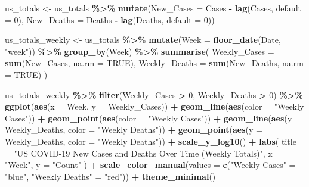 \documentclass[
]{article}
\newenvironment{Shaded}{\begin{snugshade}}{\end{snugshade}}
\newcommand{\AttributeTok}[1]{\textcolor[rgb]{0.13,0.29,0.53}{#1}}
\newcommand{\ConstantTok}[1]{\textcolor[rgb]{0.56,0.35,0.01}{#1}}
\newcommand{\DecValTok}[1]{\textcolor[rgb]{0.00,0.00,0.81}{#1}}
\newcommand{\FunctionTok}[1]{\textcolor[rgb]{0.13,0.29,0.53}{\textbf{#1}}}
\newcommand{\NormalTok}[1]{#1}
\newcommand{\OtherTok}[1]{\textcolor[rgb]{0.56,0.35,0.01}{#1}}
\newcommand{\SpecialCharTok}[1]{\textcolor[rgb]{0.81,0.36,0.00}{\textbf{#1}}}
\newcommand{\StringTok}[1]{\textcolor[rgb]{0.31,0.60,0.02}{#1}}
\begin{document}
\begin{Shaded}
\begin{Highlighting}[]
\NormalTok{us\_totals }\OtherTok{\textless{}{-}}\NormalTok{ us\_totals }\SpecialCharTok{\%\textgreater{}\%}
  \FunctionTok{mutate}\NormalTok{(}\AttributeTok{New\_Cases =}\NormalTok{ Cases }\SpecialCharTok{{-}} \FunctionTok{lag}\NormalTok{(Cases, }\AttributeTok{default =} \DecValTok{0}\NormalTok{),}
         \AttributeTok{New\_Deaths =}\NormalTok{ Deaths }\SpecialCharTok{{-}} \FunctionTok{lag}\NormalTok{(Deaths, }\AttributeTok{default =} \DecValTok{0}\NormalTok{))}

\NormalTok{us\_totals\_weekly }\OtherTok{\textless{}{-}}\NormalTok{ us\_totals }\SpecialCharTok{\%\textgreater{}\%}
  \FunctionTok{mutate}\NormalTok{(}\AttributeTok{Week =} \FunctionTok{floor\_date}\NormalTok{(Date, }\StringTok{"week"}\NormalTok{)) }\SpecialCharTok{\%\textgreater{}\%}
  \FunctionTok{group\_by}\NormalTok{(Week) }\SpecialCharTok{\%\textgreater{}\%}
  \FunctionTok{summarise}\NormalTok{(}
    \AttributeTok{Weekly\_Cases =} \FunctionTok{sum}\NormalTok{(New\_Cases, }\AttributeTok{na.rm =} \ConstantTok{TRUE}\NormalTok{),}
    \AttributeTok{Weekly\_Deaths =} \FunctionTok{sum}\NormalTok{(New\_Deaths, }\AttributeTok{na.rm =} \ConstantTok{TRUE}\NormalTok{)}
\NormalTok{  )}

\NormalTok{us\_totals\_weekly }\SpecialCharTok{\%\textgreater{}\%}
  \FunctionTok{filter}\NormalTok{(Weekly\_Cases }\SpecialCharTok{\textgreater{}} \DecValTok{0}\NormalTok{, Weekly\_Deaths }\SpecialCharTok{\textgreater{}} \DecValTok{0}\NormalTok{) }\SpecialCharTok{\%\textgreater{}\%}
  \FunctionTok{ggplot}\NormalTok{(}\FunctionTok{aes}\NormalTok{(}\AttributeTok{x =}\NormalTok{ Week, }\AttributeTok{y =}\NormalTok{ Weekly\_Cases)) }\SpecialCharTok{+}
  \FunctionTok{geom\_line}\NormalTok{(}\FunctionTok{aes}\NormalTok{(}\AttributeTok{color =} \StringTok{"Weekly Cases"}\NormalTok{)) }\SpecialCharTok{+}
  \FunctionTok{geom\_point}\NormalTok{(}\FunctionTok{aes}\NormalTok{(}\AttributeTok{color =} \StringTok{"Weekly Cases"}\NormalTok{)) }\SpecialCharTok{+}
  \FunctionTok{geom\_line}\NormalTok{(}\FunctionTok{aes}\NormalTok{(}\AttributeTok{y =}\NormalTok{ Weekly\_Deaths, }\AttributeTok{color =} \StringTok{"Weekly Deaths"}\NormalTok{)) }\SpecialCharTok{+}
  \FunctionTok{geom\_point}\NormalTok{(}\FunctionTok{aes}\NormalTok{(}\AttributeTok{y =}\NormalTok{ Weekly\_Deaths, }\AttributeTok{color =} \StringTok{"Weekly Deaths"}\NormalTok{)) }\SpecialCharTok{+}
  \FunctionTok{scale\_y\_log10}\NormalTok{() }\SpecialCharTok{+}
  \FunctionTok{labs}\NormalTok{(}
    \AttributeTok{title =} \StringTok{"US COVID{-}19 New Cases and Deaths Over Time (Weekly Totals)"}\NormalTok{,}
    \AttributeTok{x =} \StringTok{"Week"}\NormalTok{,}
    \AttributeTok{y =} \StringTok{"Count"}
\NormalTok{  ) }\SpecialCharTok{+}
  \FunctionTok{scale\_color\_manual}\NormalTok{(}\AttributeTok{values =} \FunctionTok{c}\NormalTok{(}\StringTok{"Weekly Cases"} \OtherTok{=} \StringTok{"blue"}\NormalTok{, }\StringTok{"Weekly Deaths"} \OtherTok{=} \StringTok{"red"}\NormalTok{)) }\SpecialCharTok{+}
  \FunctionTok{theme\_minimal}\NormalTok{()}
\end{Highlighting}
\end{Shaded}
\end{document}
